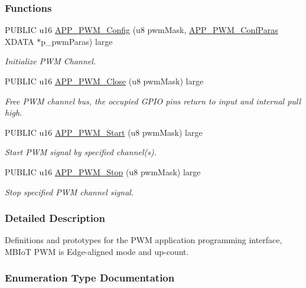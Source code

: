 \subsubsection*{Functions}
\begin{DoxyCompactItemize}
\item 
P\+U\+B\+L\+IC u16 \hyperlink{group___p_w_m_ga4a97f9ecae78dbaf856004cbac253bd6}{A\+P\+P\+\_\+\+P\+W\+M\+\_\+\+Config} (u8 pwm\+Mask, \hyperlink{struct_a_p_p___p_w_m___conf_paras}{A\+P\+P\+\_\+\+P\+W\+M\+\_\+\+Conf\+Paras} X\+D\+A\+TA $\ast$p\+\_\+pwm\+Paras) large
\begin{DoxyCompactList}\small\item\em Initialize P\+WM Channel. \end{DoxyCompactList}\item 
P\+U\+B\+L\+IC u16 \hyperlink{group___p_w_m_ga76fb6c9c661e7134731de4b8287580bf}{A\+P\+P\+\_\+\+P\+W\+M\+\_\+\+Close} (u8 pwm\+Mask) large
\begin{DoxyCompactList}\small\item\em Free P\+WM channel bus, the occupied G\+P\+IO pins return to input and internal pull high. \end{DoxyCompactList}\item 
P\+U\+B\+L\+IC u16 \hyperlink{group___p_w_m_gae1aa285b6fff3ec07f0c713fd22d030e}{A\+P\+P\+\_\+\+P\+W\+M\+\_\+\+Start} (u8 pwm\+Mask) large
\begin{DoxyCompactList}\small\item\em Start P\+WM signal by specified channel(s). \end{DoxyCompactList}\item 
P\+U\+B\+L\+IC u16 \hyperlink{group___p_w_m_gab7d42fcb17a7ae21afe7eafd5ab4053d}{A\+P\+P\+\_\+\+P\+W\+M\+\_\+\+Stop} (u8 pwm\+Mask) large
\begin{DoxyCompactList}\small\item\em Stop specified P\+WM channel signal. \end{DoxyCompactList}\end{DoxyCompactItemize}


\subsubsection{Detailed Description}
Definitions and prototypes for the P\+WM application programming interface, M\+B\+IoT P\+WM is Edge-\/aligned mode and up-\/count. 



\subsubsection{Enumeration Type Documentation}
